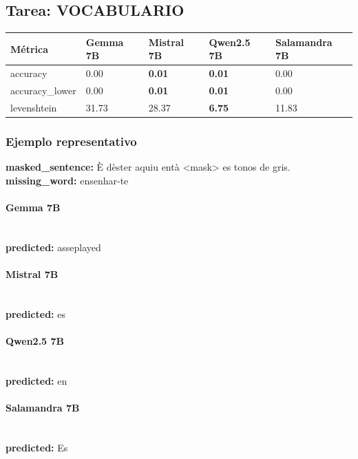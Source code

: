 \subsection{Tarea: VOCABULARIO}\label{tarea-vocabulario}
{\def\LTcaptype{none}
\begin{longtable}[]{@{}lllll@{}}
\toprule\noalign{}
Métrica & Gemma 7B & Mistral 7B & Qwen2.5 7B & Salamandra 7B \\
\midrule\noalign{}
\endhead
\bottomrule\noalign{}
\endlastfoot
accuracy & 0.00 & \textbf{0.01} & \textbf{0.01} & 0.00 \\
accuracy\_lower & 0.00 & \textbf{0.01} & \textbf{0.01} & 0.00 \\
levenshtein & 31.73 & 28.37 & \textbf{6.75} & 11.83 \\
\end{longtable}}

\subsubsection{Ejemplo representativo}
\textbf{masked\_sentence:} È d\textquotesingle{}èster aquiu entà {\textless}mask{\textgreater} es tonos de gris.\\
\textbf{missing\_word:} ensenhar-te\\

\paragraph{Gemma 7B}~\\
\textbf{predicted:} asseplayed\\

\paragraph{Mistral 7B}~\\
\textbf{predicted:} es\\

\paragraph{Qwen2.5 7B}~\\
\textbf{predicted:} en\\

\paragraph{Salamandra 7B}~\\
\textbf{predicted:} Es\\


